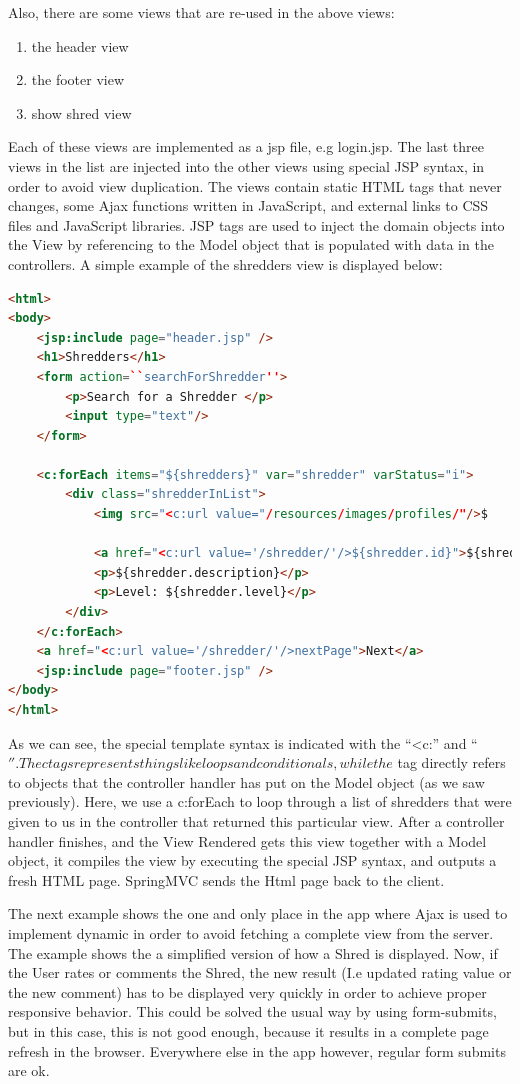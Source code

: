 Also, there are some views that are re-used in the above views:
\begin{enumerate}
\item{} the header view
\item{} the footer view
\item{} show shred view
\end{enumerate}

Each of these views are implemented as a jsp file, e.g login.jsp. The last three views in the list are injected into the other views using special JSP syntax, in order to avoid view duplication. The views contain static HTML tags that never changes, some Ajax functions written in JavaScript, and external links to CSS files and JavaScript libraries. JSP tags are used to inject the domain objects into the View by referencing to the Model object that is populated with data in the controllers. A simple example of the shredders view is displayed below:

\begin{lstlisting}[language=html]
<html>
<body>
	<jsp:include page="header.jsp" />	
	<h1>Shredders</h1>		
	<form action=``searchForShredder''>
		<p>Search for a Shredder </p>
		<input type="text"/>
	</form>
		
	<c:forEach items="${shredders}" var="shredder" varStatus="i">
		<div class="shredderInList">
			<img src="<c:url value="/resources/images/profiles/"/>$								{shredder.profileImagePath}"	alt="Profile img">

			<a href="<c:url value='/shredder/'/>${shredder.id}">${shredder.username}</a>
			<p>${shredder.description}</p>
			<p>Level: ${shredder.level}</p>
		</div>
	</c:forEach>
	<a href="<c:url value='/shredder/'/>nextPage">Next</a>
	<jsp:include page="footer.jsp" />
</body>
</html>
\end{lstlisting}
As we can see, the special template syntax is indicated with the ``<c:'' and ``$''. The c tags represents things like loops and conditionals, while the $ tag directly refers to objects that the controller handler has put on the Model object (as we saw previously). Here, we use a c:forEach to loop through a list of shredders that were given to us in the controller that returned this particular view. After a controller handler finishes, and the View Rendered gets this view together with a Model object, it compiles the view by executing the special JSP syntax, and outputs a fresh HTML page. SpringMVC sends the Html page back to the client. 
 
The next example shows the one and only place in the app where Ajax is used to implement dynamic in order to avoid fetching a complete view from the server. The example shows the a simplified version of how a Shred is displayed. Now, if the User rates or comments the Shred, the new result (I.e updated rating value or the new comment) has to be displayed very quickly in order to achieve proper responsive behavior. This could be solved the usual way by using form-submits, but in this case, this is not good enough, because it results in a complete page refresh in the browser. Everywhere else in the app however, regular form submits are ok.

